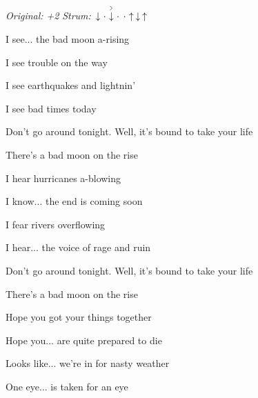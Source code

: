 \begin{song}


\begin{headerbox}
\RaiseBoxWithAccents
\textit{Original: +2} \quad
\textit{Strum:} $\Down\Miss\AccentDown\Miss\Miss\Up\Down\Up$
\end{headerbox}

\begin{hchordbox}
\end{hchordbox}

\Large

\bigskip

I see... the bad moon a-rising \par
{}I see trouble on the way \par
{}I see earthquakes and lightnin’ \par
{}I see bad times today \par

\bigskip

Don’t go around tonight. Well, it’s bound to take your life \par
{}There’s a bad moon on the rise \par

\bigskip

I hear hurricanes a-blowing \par
{}I know... the end is coming soon \par
{}I fear rivers overflowing \par
{}I hear... the voice of rage and ruin \par

\bigskip

Don’t go around tonight. Well, it’s bound to take your life \par
{}There’s a bad moon on the rise \par

\bigskip

Hope you got your things together \par
{}Hope you... are quite prepared to die \par
{}Looks like... we’re in for nasty weather \par
{}One eye... is taken for an eye \par


\end{song}
